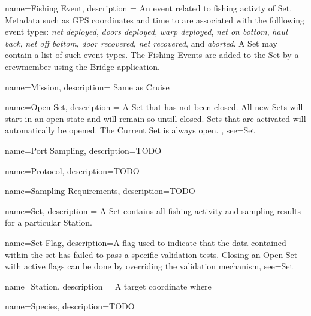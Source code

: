  {
  name=Fishing Event,
  description = {
    An event related to fishing activty of \gls{Set}.
    Metadata such as GPS coordinates and time to are associated with the folllowing event types:
    \emph{net deployed},
    \emph{doors deployed},
    \emph{warp deployed},
    \emph{net on bottom},
    \emph{haul back},
    \emph{net off bottom},
    \emph{door recovered},
    \emph{net recovered},
    and \emph{aborted}.
    A \gls{Set} may contain a list of such event types.
    The Fishing Events are added to the \gls{Set} by a crewmember using the \gls{Bridge} application.
  }
}
  

 {
  name=Mission,
  description={
    Same as \gls{Cruise}
  }
}

 {
  name=Open Set,
  description = {
    A \gls{Set} that has not been closed. All new Sets will start in an open state and will remain so untill closed. 
    Sets that are activated will automatically be opened. 
    The \gls{Current Set} is always open.
  },
  see={Set}
}

 {
  name=Port Sampling,
  description={TODO}
}

 {
  name=Protocol,
  description={TODO}
}

 {
  name=Sampling Requirements,
  description={TODO}
}
    
 {
  name=Set,
  description = {
    A Set contains all fishing activity and sampling results for a particular \gls{Station}.
  }
}


 {
  name=Set Flag,
  description={A flag used to indicate that the data contained within the set has failed to pass a specific validation tests. 
  Closing an \gls{Open Set} with active flags can be done by overriding the validation mechanism},
  see=\gls{Set}
  }

 {
  name=Station,
  description = {
    A target coordinate where
  }
}
  
 {
  name=Species,
  description={TODO}
}

\glsaddall
\glsaddallunused
